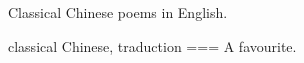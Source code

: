 Classical Chinese poems in English.

classical Chinese, traduction
===
A favourite.
\nocite{wong2022}